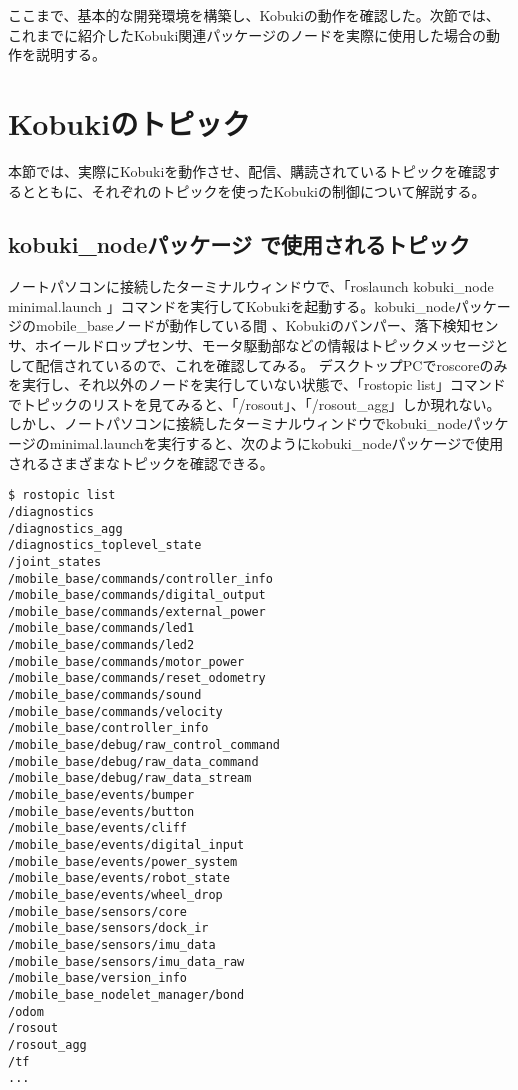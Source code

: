 ここまで、基本的な開発環境を構築し、Kobukiの動作を確認した。次節では、これまでに紹介したKobuki関連パッケージのノードを実際に使用した場合の動作を説明する。

\section{Kobukiのトピック}

本節では、実際にKobukiを動作させ、配信、購読されているトピックを確認するとともに、それぞれのトピックを使ったKobukiの制御について解説する。

\subsection{kobuki\_nodeパッケージ  で使用されるトピック}

ノートパソコンに接続したターミナルウィンドウで、「roslaunch kobuki\_node minimal.launch 」コマンドを実行してKobukiを起動する。kobuki\_nodeパッケージのmobile\_baseノードが動作している間 、Kobukiのバンパー、落下検知センサ、ホイールドロップセンサ、モータ駆動部などの情報はトピックメッセージとして配信されているので、これを確認してみる。
デスクトップPCでroscoreのみを実行し、それ以外のノードを実行していない状態で、「rostopic list」コマンドでトピックのリストを見てみると、「/rosout」、「/rosout\_agg」しか現れない。しかし、ノートパソコンに接続したターミナルウィンドウでkobuki\_nodeパッケージのminimal.launchを実行すると、次のようにkobuki\_nodeパッケージで使用されるさまざまなトピックを確認できる。

\begin{lstlisting}[language=ROS]
$ rostopic list
/diagnostics
/diagnostics_agg
/diagnostics_toplevel_state
/joint_states
/mobile_base/commands/controller_info
/mobile_base/commands/digital_output
/mobile_base/commands/external_power
/mobile_base/commands/led1
/mobile_base/commands/led2
/mobile_base/commands/motor_power
/mobile_base/commands/reset_odometry
/mobile_base/commands/sound
/mobile_base/commands/velocity
/mobile_base/controller_info
/mobile_base/debug/raw_control_command
/mobile_base/debug/raw_data_command
/mobile_base/debug/raw_data_stream
/mobile_base/events/bumper
/mobile_base/events/button
/mobile_base/events/cliff
/mobile_base/events/digital_input
/mobile_base/events/power_system
/mobile_base/events/robot_state
/mobile_base/events/wheel_drop
/mobile_base/sensors/core
/mobile_base/sensors/dock_ir
/mobile_base/sensors/imu_data
/mobile_base/sensors/imu_data_raw
/mobile_base/version_info
/mobile_base_nodelet_manager/bond
/odom
/rosout
/rosout_agg
/tf
...
\end{lstlisting}

